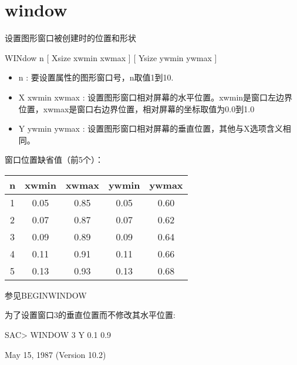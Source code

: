\section{window}
\label{cmd:window}

设置图形窗口被创建时的位置和形状

WINdow n [ Xsize xwmin xwmax ]  [ Ysize ywmin ywmax ]

\begin{itemize}
\item n : 要设置属性的图形窗口号，n取值1到10. 
\item X xwmin xwmax : 设置图形窗口相对屏幕的水平位置。xwmin是窗口左边界位置，xwmax是窗口右边界位置，相对屏幕的坐标取值为0.0到1.0  
\item Y ywmin ywmax : 设置图形窗口相对屏幕的垂直位置，其他与X选项含义相同。
\end{itemize}

窗口位置缺省值（前5个）： 

\begin{tabular}{ccccc}
\toprule
 n & xwmin & xwmax & ywmin & ywmax  \\
\midrule
 1 & 0.05  & 0.85  & 0.05  & 0.60 \\
 2 & 0.07  & 0.87  & 0.07  & 0.62 \\
 3 & 0.09  & 0.89  & 0.09  & 0.64 \\
 4 & 0.11  & 0.91  & 0.11  & 0.66 \\
 5 & 0.13  & 0.93  & 0.13  & 0.68 \\
\bottomrule
\end{tabular}

参见BEGINWINDOW

为了设置窗口3的垂直位置而不修改其水平位置:
\begin{SACCode}
SAC> WINDOW 3 Y 0.1 0.9
\end{SACCode}

May 15, 1987 (Version 10.2)

